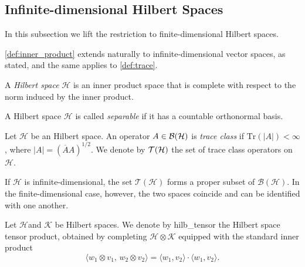 \subsection{Infinite-dimensional Hilbert Spaces}
In this subsection we lift the restriction to finite-dimensional Hilbert spaces.

\autoref{def:inner_product} extends naturally to infinite-dimensional vector spaces, as stated, and the same applies to \autoref{def:trace}.

\begin{definition}
  A \emph{Hilbert space} $\mathcal{H}$ is an inner product space that is complete with respect to the norm induced by the inner product.
\end{definition}


\begin{definition}
  A Hilbert space \( \mathcal{H} \) is called \emph{separable} if it has a countable orthonormal basis.
\end{definition}

\begin{definition}
  Let $\mathcal{H}$ be an Hilbert space. An operator $A \in \mathcal{B}(\mathcal{H}) $ is \emph{trace class} if $\text{Tr}(|A|) < \infty$, where $|A|= \left(\overline{A}A \right)^{1/2}$.  We denote by $\mathcal{T} (\mathcal{H})$ the set of trace class operators on $\mathcal{H}$.
\end{definition}
If $\mathcal{H}$ is infinite-dimensional, the set $\mathcal{T}(\mathcal{H})$ forms a proper subset of $\mathcal{B}(\mathcal{H})$. In the finite-dimensional case, however, the two spaces coincide and can be identified with one another.

\begin{definition}
  Let \( \mathcal{H} \)and \( \mathcal{K} \) be Hilbert spaces. We denote by \gls{hilb_tensor} the Hilbert space tensor product, obtained by completing \( \mathcal{H}  \otimes \mathcal{K} \) equipped with the standard inner product
\[
\langle w_1 \otimes v_1,\, w_2 \otimes v_2 \rangle = \langle w_1, v_2 \rangle \cdot \langle w_1, v_2 \rangle.
\] 
\end{definition}

